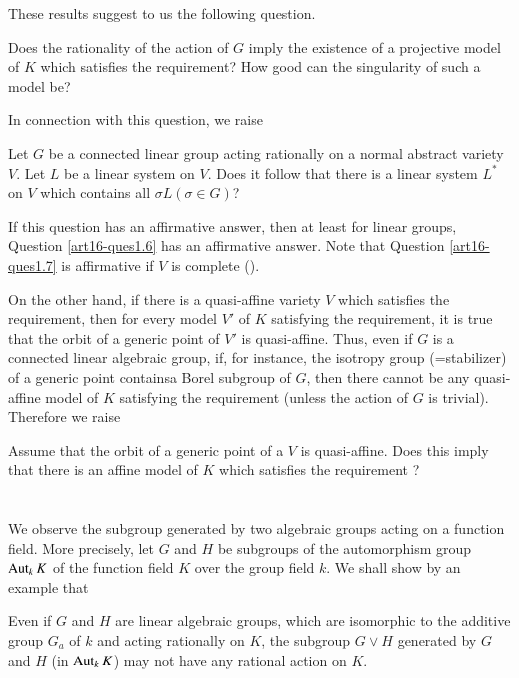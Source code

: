 These results suggest to us the following question.

\begin{question}\label{art16-ques1.6}
Does the rationality of the action of $G$ imply the existence of a projective model of $K$ which satisfies the requirement? How good can the singularity of such a model be?
\end{question}

In connection with this question, we raise

\begin{question}\label{art16-ques1.7}
Let $G$ be a connected linear group acting rationally on a normal abstract variety $V$. Let $L$ be a linear system on $V$. Does it follow that there is a linear system $L^{*}$ on $V$ which contains all $\sigma L(\sigma\in G)$?
\end{question}

If this question has an affirmative answer, then at least for linear groups, Question \ref{art16-ques1.6} has an affirmative answer. Note that Question \ref{art16-ques1.7} is affirmative if $V$ is complete (\cite{art16-key-K}).

On the other hand, if there is a quasi-affine variety $V$ which satisfies the requirement, then for every model $V'$ of $K$ satisfying the requirement, it is true that the orbit of a generic point of $V'$ is quasi-affine. Thus, even if $G$ is a connected linear algebraic group, if, for instance, the isotropy group (=stabilizer) of a generic point contains\pageoriginale a Borel subgroup of $G$, then there cannot be any quasi-affine model of $K$ satisfying the requirement (unless the action of $G$ is trivial). Therefore we raise

\begin{question}\label{art16-ques1.8}
Assume that the orbit of a generic point of a $V$ is quasi-affine. Does this imply that there is an affine model of $K$ which satisfies the requirement ?
\end{question}

\section{}\label{art16-sec2}
We observe the subgroup generated by two algebraic groups acting on a function field. More precisely, let $G$ and $H$ be subgroups of the automorphism group $\operatorname{\mathrm{Aut}}_{k}K$ of the function field $K$ over the group field $k$. We shall show by an example that

\begin{proposition}\label{art16-prop2.1}
Even if $G$ and $H$ are linear algebraic groups, which are isomorphic to the additive group $G_{a}$ of $k$ and acting rationally on $K$, the subgroup $G\vee H$ generated by $G$ and $H$ (in $\operatorname{\mathrm{Aut}}_{k}K$) may not have any rational action on $K$.
\end{proposition}

